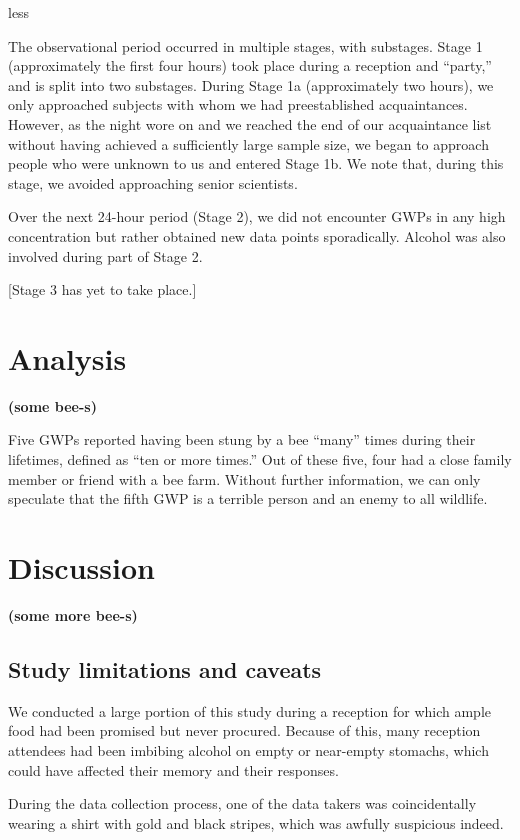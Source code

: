 less\documentclass[aps,prl,preprint,groupedaddress,twocolumn]{revtex4-1}
\begin{document}
The observational period occurred in multiple stages, with substages.
Stage 1 (approximately the first four hours) took place during a reception
and ``party,'' and is split into two substages. During Stage 1a (approximately
two hours), we only approached subjects with
whom we had preestablished acquaintances. However, as the night wore on
and we reached the end of our acquaintance list without having achieved
a sufficiently large sample size, we began to approach
people who were unknown to us and entered Stage 1b. We note that,
during this stage, we avoided approaching senior scientists.

Over the next 24-hour period (Stage 2), we did not encounter GWPs in
any high concentration but rather obtained new data points sporadically.
Alcohol was also involved during part of Stage 2.

[Stage 3 has yet to take place.]


\section{Analysis}

\textbf{(some bee-s)}

Five GWPs reported having been stung by a bee ``many'' times during
their lifetimes, defined as ``ten or more times.'' Out of these five,
four had a close family member or friend with a bee farm. Without further
information, we can only speculate that the fifth GWP is a terrible
person and an enemy to all wildlife.


\section{Discussion}

\textbf{(some more bee-s)}

\subsection{Study limitations and caveats}

We conducted a large portion of this study during a
reception for which ample food had been
promised but never procured. Because of this, many reception attendees
had been imbibing alcohol on empty or near-empty stomachs, which could
have affected their memory and their responses.

During the data collection process, one of the data takers was
coincidentally wearing a shirt with gold and black stripes, which
was awfully suspicious indeed.
\end{document}
